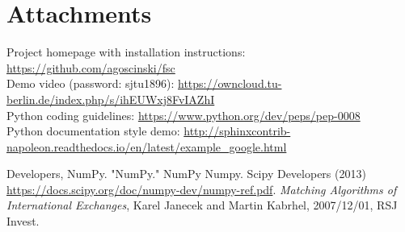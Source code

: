\documentclass[a4paper, 11pt]{article}
\begin{document}
\section*{Attachments}
Project homepage with installation instructions: \url{https://github.com/agoscinski/fsc} \\
Demo video (password: sjtu1896): \url{https://owncloud.tu-berlin.de/index.php/s/ihEUWxj8FvIAZhI} \\
Python coding guidelines: \url{https://www.python.org/dev/peps/pep-0008} \\
Python documentation style demo: \url{http://sphinxcontrib-napoleon.readthedocs.io/en/latest/example_google.html}

\begin{thebibliography}{9}
 Developers, NumPy. "NumPy." NumPy Numpy. Scipy Developers (2013) \url{https://docs.scipy.org/doc/numpy-dev/numpy-ref.pdf}.
 \textit{Matching Algorithms of International Exchanges}, Karel Janecek and Martin Kabrhel, 2007/12/01, RSJ Invest.
\end{thebibliography}
\end{document}
